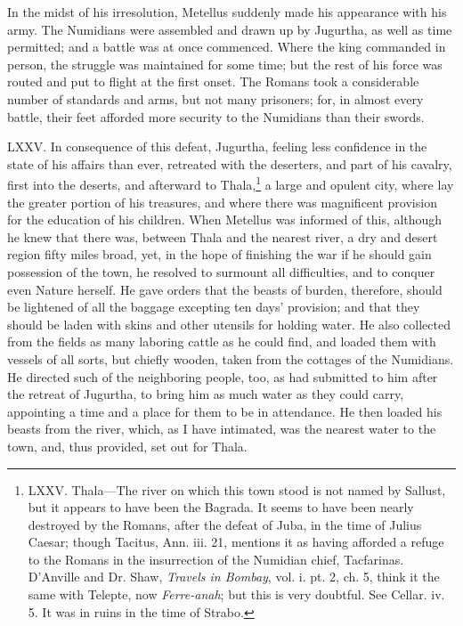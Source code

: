In the midst of his irresolution, Metellus suddenly made his
appearance with his army. The Numidians were assembled and drawn up by
Jugurtha, as well as time permitted; and a battle was at once
commenced. Where the king commanded in person, the struggle was
maintained for some time; but the rest of his force was routed and put
to flight at the first onset. The Romans took a considerable number of
standards and arms, but not many prisoners; for, in almost every
battle, their feet afforded more security to the Numidians than their
swords.

LXXV. In consequence of this defeat, Jugurtha, feeling less confidence
in the state of his affairs than ever, retreated with the deserters,
and part of his cavalry, first into the deserts, and afterward to
Thala,\footnote{LXXV. Thala—The river on which this town stood is not named by
Sallust, but it appears to have been the Bagrada. It seems to have been
nearly destroyed by the Romans, after the defeat of Juba, in the time
of Julius Caesar; though Tacitus, Ann. iii. 21, mentions it as having
afforded a refuge to the Romans in the insurrection of the Numidian
chief, Tacfarinas. D'Anville and Dr. Shaw, \emph{Travels in Bombay}, vol.
i. pt. 2, ch. 5, think it the same with Telepte, now \emph{Ferre-anah}; but
this is very doubtful. See Cellar. iv. 5. It was in ruins in the time
of Strabo.} a large and opulent city, where lay the greater portion of
his treasures, and where there was magnificent provision for the
education of his children. When Metellus was informed of this,
although he knew that there was, between Thala and the nearest river,
a dry and desert region fifty miles broad, yet, in the hope of
finishing the war if he should gain possession of the town, he
resolved to surmount all difficulties, and to conquer even Nature
herself. He gave orders that the beasts of burden, therefore, should
be lightened of all the baggage excepting ten days' provision; and
that they should be laden with skins and other utensils for holding
water. He also collected from the fields as many laboring cattle as he
could find, and loaded them with vessels of all sorts, but chiefly
wooden, taken from the cottages of the Numidians. He directed such of
the neighboring people, too, as had submitted to him after the retreat
of Jugurtha, to bring him as much water as they could carry,
appointing a time and a place for them to be in attendance. He then
loaded his beasts from the river, which, as I have intimated, was the
nearest water to the town, and, thus provided, set out for Thala.

